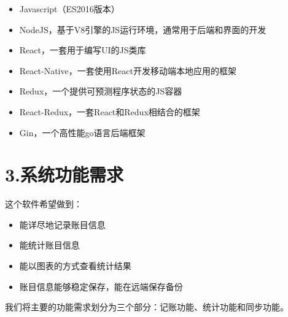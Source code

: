 \documentclass{article}
\begin{document}
\begin{itemize}[noitemsep,topsep=\mdcompacttopsep]%

\item{}Javascript（ES2016版本）%

\item{}NodeJS，基于V8引擎的JS运行环境，通常用于后端和界面的开发%

\item{}React，一套用于编写UI的JS类库%

\item{}React-Native，一套使用React开发移动端本地应用的框架%

\item{}Redux，一个提供可预测程序状态的JS容器%

\item{}React-Redux，一套React和Redux相结合的框架%

\item{}Gin，一个高性能go语言后端框架%
\end{itemize}%

\section{3.\hspace*{0.5em}系统功能需求}\label{section}%

\noindent{}这个软件希望做到：%

\begin{itemize}[noitemsep,topsep=\mdcompacttopsep]%

\item{}能详尽地记录账目信息%

\item{}能统计账目信息%

\item{}能以图表的方式查看统计结果%

\item{}账目信息能够稳定保存，能在远端保存备份%
\end{itemize}%

\noindent{}我们将主要的功能需求划分为三个部分：记账功能、统计功能和同步功能。%
\end{document}
